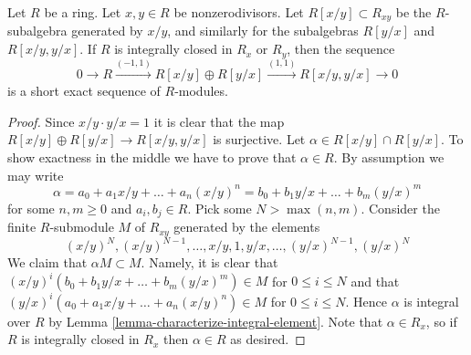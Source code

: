 \begin{lemma}
\label{lemma-silly-normal}
Let $R$ be a ring. Let $x, y \in R$ be nonzerodivisors.
Let $R[x/y] \subset R_{xy}$ be the $R$-subalgebra generated
by $x/y$, and similarly for the subalgebras $R[y/x]$ and $R[x/y, y/x]$.
If $R$ is integrally closed in $R_x$ or $R_y$, then the sequence
$$
0 \to R \xrightarrow{(-1, 1)} R[x/y] \oplus R[y/x] \xrightarrow{(1, 1)}
R[x/y, y/x] \to 0
$$
is a short exact sequence of $R$-modules.
\end{lemma}

\begin{proof}
Since $x/y \cdot y/x = 1$ it is clear that the map
$R[x/y] \oplus R[y/x] \to R[x/y, y/x]$ is surjective.
Let $\alpha \in R[x/y] \cap R[y/x]$. To show exactness in the middle
we have to prove that $\alpha \in R$. By assumption we may write
$$
\alpha = a_0 + a_1 x/y + \ldots + a_n (x/y)^n =
b_0 + b_1 y/x + \ldots + b_m(y/x)^m
$$
for some $n, m \geq 0$ and $a_i, b_j \in R$.
Pick some $N > \max(n, m)$.
Consider the finite $R$-submodule $M$ of $R_{xy}$ generated by the elements
$$
(x/y)^N, (x/y)^{N - 1}, \ldots, x/y, 1, y/x, \ldots, (y/x)^{N - 1}, (y/x)^N
$$
We claim that $\alpha M \subset M$. Namely, it is clear that
$(x/y)^i (b_0 + b_1 y/x + \ldots + b_m(y/x)^m) \in M$ for
$0 \leq i \leq N$ and that
$(y/x)^i (a_0 + a_1 x/y + \ldots + a_n(x/y)^n) \in M$ for
$0 \leq i \leq N$. Hence $\alpha$ is integral over $R$ by
Lemma \ref{lemma-characterize-integral-element}. Note that
$\alpha \in R_x$, so if $R$ is integrally closed in $R_x$
then $\alpha \in R$ as desired.
\end{proof}